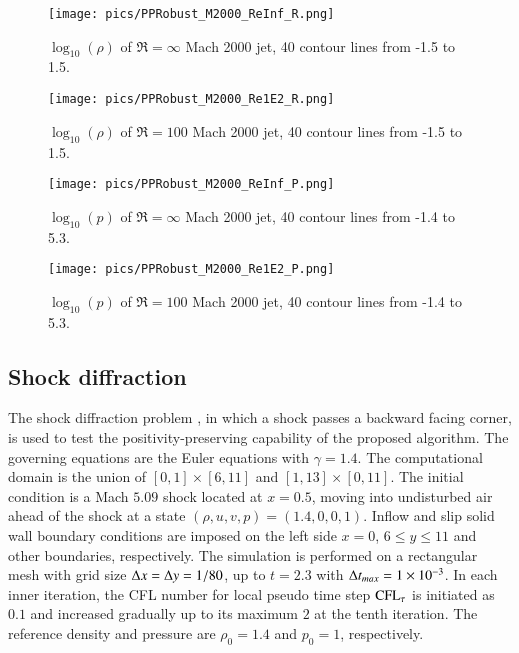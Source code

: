 \begin{figure}[htbp]
    \centering
    \texttt{[image: pics/PPRobust\_M2000\_ReInf\_R.png]}
    \caption{$\log_{10}(\rho)$ of $\Re=\infty$ Mach 2000 jet, 40 contour lines from -1.5 to 1.5.}
    \label{fig:M2000_ReInf_R}
\end{figure}

\begin{figure}[htbp]
    \centering
    \texttt{[image: pics/PPRobust\_M2000\_Re1E2\_R.png]}
    \caption{$\log_{10}(\rho)$ of $\Re=100$ Mach 2000 jet, 40 contour lines from -1.5 to 1.5.}
    \label{fig:M2000_Re1E2_R}
\end{figure}

\begin{figure}[htbp]
    \centering
    \texttt{[image: pics/PPRobust\_M2000\_ReInf\_P.png]}
    \caption{$\log_{10}(p)$ of $\Re=\infty$ Mach 2000 jet, 40 contour lines from -1.4 to 5.3.}
    \label{fig:M2000_ReInf_P}
\end{figure}

\begin{figure}[htbp]
    \centering
    \texttt{[image: pics/PPRobust\_M2000\_Re1E2\_P.png]}
    \caption{$\log_{10}(p)$ of $\Re=100$ Mach 2000 jet, 40 contour lines from -1.4 to 5.3.}
    \label{fig:M2000_Re1E2_P}
\end{figure}

\subsection{Shock diffraction}

The shock diffraction problem \cite{zhang2010positivity}, in which a shock passes a backward facing corner,
is used to test the positivity-preserving capability of the proposed algorithm.
The governing equations are the Euler equations with $\gamma = 1.4$.
The computational domain is the union of $[0,1]\times[6,11]$ and $[1,13]\times[0,11]$.
The initial condition is a Mach $5.09$ shock located at $x=0.5$,
moving into undisturbed air ahead of the shock at a state $(\rho, u, v, p)=(1.4,0,0,1)$.
Inflow and slip solid wall boundary conditions are imposed on
the left side $x = 0$, $6\leq y \leq 11$ and other boundaries, respectively.
The simulation is performed on a rectangular mesh with grid size $\mathrm\Delta x = \mathrm\Delta y = 1/80$,
up to $t=2.3$ with $\mathrm\Delta t_{max}=1\times 10^{-3}$.
In each inner iteration, the CFL number for local pseudo time step $\text{CFL}_\tau$ is initiated as $0.1$
and increased gradually up to its maximum $2$ at the tenth iteration.
The reference density and pressure are $\rho_0=1.4$ and $p_0=1$, respectively.

